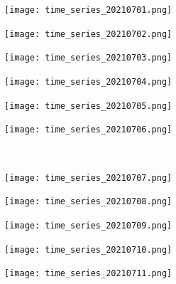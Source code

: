 \documentclass[10pt]{article}
\begin{document}
\begin{figure}[!h]
    \centering
    \begin{subfigure}[b]{0.166\linewidth}
        \centering
        \texttt{[image: time\_series\_20210701.png]}
    \end{subfigure}%
        \begin{subfigure}[b]{0.166\linewidth}
        \centering
        \texttt{[image: time\_series\_20210702.png]}
    \end{subfigure}%
    \begin{subfigure}[b]{0.166\linewidth}
        \centering
        \texttt{[image: time\_series\_20210703.png]}
    \end{subfigure}%
    \begin{subfigure}[b]{0.166\linewidth}
        \centering
        \texttt{[image: time\_series\_20210704.png]}
    \end{subfigure}%
    \begin{subfigure}[b]{0.166\linewidth}
        \centering
        \texttt{[image: time\_series\_20210705.png]}
    \end{subfigure}%
    \begin{subfigure}[b]{0.166\linewidth}
        \centering
        \texttt{[image: time\_series\_20210706.png]}
    \end{subfigure}
    \\
        \begin{subfigure}[b]{0.166\linewidth}
        \centering
        \texttt{[image: time\_series\_20210707.png]}
    \end{subfigure}%
    \begin{subfigure}[b]{0.166\linewidth}
        \centering
        \texttt{[image: time\_series\_20210708.png]}
    \end{subfigure}%
    \begin{subfigure}[b]{0.166\linewidth}
        \centering
        \texttt{[image: time\_series\_20210709.png]}
    \end{subfigure}%
    \begin{subfigure}[b]{0.166\linewidth}
        \centering
        \texttt{[image: time\_series\_20210710.png]}
    \end{subfigure}%
    \begin{subfigure}[b]{0.166\linewidth}
        \centering
        \texttt{[image: time\_series\_20210711.png]}

\end{subfigure}
\end{figure}
\end{document}
